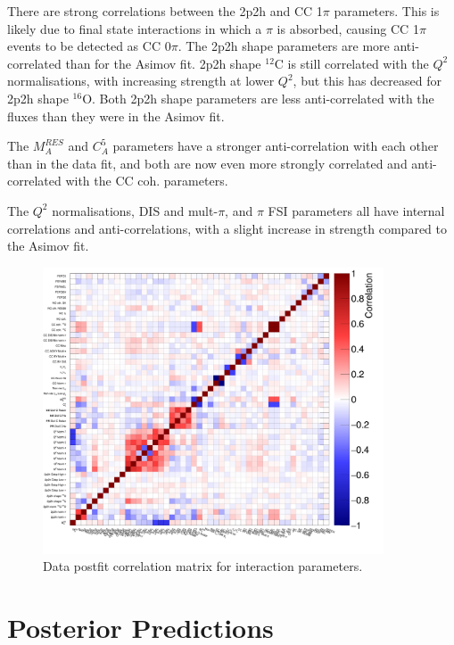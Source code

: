 There are strong correlations between the 2p2h and CC 1$\pi$ parameters. This is likely due to final state interactions in which a $\pi$ is absorbed, causing CC 1$\pi$ events to be detected as CC 0$\pi$. The 2p2h shape parameters are more anti-correlated than for the Asimov fit. 2p2h shape $^{12}$C is still correlated with the $Q^2$ normalisations, with increasing strength at lower $Q^2$, but this has decreased for 2p2h shape $^{16}$O. Both 2p2h shape parameters are less anti-correlated with the fluxes than they were in the Asimov fit.

The $M_{A}^{RES}$ and $C_{A}^5$ parameters have a stronger anti-correlation with each other than in the data fit, and both are now even more strongly correlated and anti-correlated with the CC coh. parameters.

The $Q^2$ normalisations, DIS and mult-$\pi$, and $\pi$ FSI parameters all have internal correlations and anti-correlations, with a slight increase in strength compared to the Asimov fit. 

\begin{figure}[!htbp]
\centering
\includegraphics*[width=0.9\textwidth,clip]{figs/MaCh3DataCorrXsec}
\caption{Data postfit correlation matrix for interaction parameters.}\label{fig:datpostfitcovXsec}
\end{figure}

\section{Posterior Predictions}\label{sec:respostpred}

